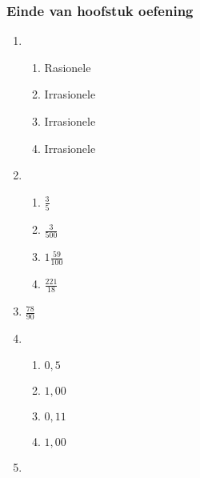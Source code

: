 {\begin{multicols}{3}
\subsubsection*{Einde van hoofstuk oefening} %


\begin{enumerate}[noitemsep, label=\textbf{\arabic*}. ] 
\item%
    \begin{enumerate}[noitemsep, label=\textbf{(\alph*)} ] 
    \item Rasionele%
    \item Irrasionele%
    \item Irrasionele%
    \item Irrasionele%
    \end{enumerate}
\item %
    \begin{enumerate}[noitemsep, label=\textbf{(\alph*)} ] 
    \item $\frac{3}{5}$%
    \item $\frac{3}{500}$%
    \item $1\frac{59}{100}$%
    \item $\frac{221}{18}$%
    \end{enumerate}
\setcounter{enumi}{3}
\item $\frac{78}{90}$%


\item %
    \begin{enumerate}[noitemsep, label=\textbf{(\alph*)} ]  
    \item $0,5$%
    \item $1,00$%
    \item $0,11$%
    \item $1,00$%
    \end{enumerate}

\item %


\end{enumerate}
\end{multicols}}
